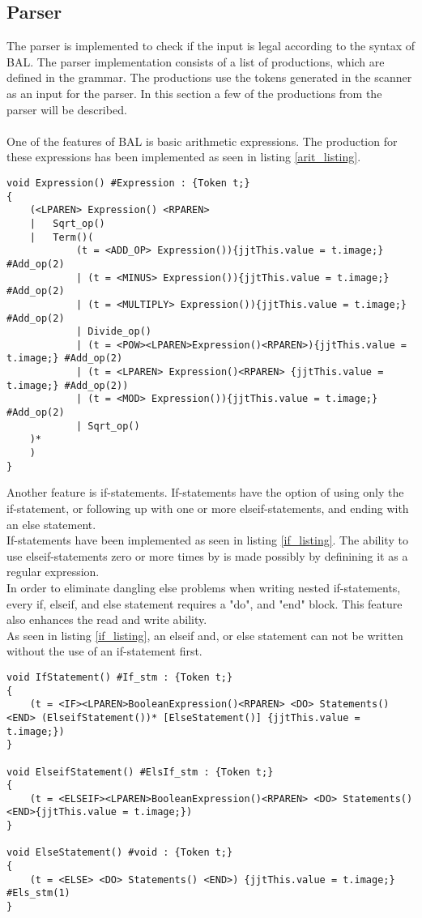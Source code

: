 \subsection{Parser}
The parser is implemented to check if the input is legal according to the syntax of BAL. The parser implementation consists of a list of productions, which are defined in the grammar. The productions use the tokens generated in the scanner as an input for the parser. In this section a few of the productions from the parser will be described.
\\
\\One of the features of BAL is basic arithmetic expressions. The production for these expressions has been implemented as seen in listing \ref{arit_listing}. 

\begin{lstlisting}[caption=Implementation of the arithmetic expressions production, label=arit_listing]
void Expression() #Expression : {Token t;}
{
	(<LPAREN> Expression() <RPAREN>
	|	Sqrt_op()
	|	Term()(
			(t = <ADD_OP> Expression()){jjtThis.value = t.image;} #Add_op(2)
			| (t = <MINUS> Expression()){jjtThis.value = t.image;} #Add_op(2)
			| (t = <MULTIPLY> Expression()){jjtThis.value = t.image;} #Add_op(2)
			| Divide_op()
			| (t = <POW><LPAREN>Expression()<RPAREN>){jjtThis.value = t.image;} #Add_op(2)
			| (t = <LPAREN> Expression()<RPAREN> {jjtThis.value = t.image;} #Add_op(2))
			| (t = <MOD> Expression()){jjtThis.value = t.image;} #Add_op(2)
			| Sqrt_op()
	)*
	)
}
\end{lstlisting}
Another feature is if-statements. If-statements have the option of using only the if-statement, or following up with one or more elseif-statements, and ending with an else statement. 
\\If-statements have been implemented as seen in listing \ref{if_listing}. The ability to use elseif-statements zero or more times by is made possibly by definining it as a regular expression.
\\In order to eliminate dangling else problems when writing nested if-statements, every if, elseif, and else statement requires a "do", and "end" block. This feature also enhances the read and write ability. 
\\As seen in listing \ref{if_listing}, an elseif and, or else statement can not be written without the use of an if-statement first.  

\begin{lstlisting}[caption=Implementation of the if\, elseif\, and else statements, label=if_listing]
void IfStatement() #If_stm : {Token t;}
{
	(t = <IF><LPAREN>BooleanExpression()<RPAREN> <DO> Statements() <END> (ElseifStatement())* [ElseStatement()] {jjtThis.value = t.image;})
}

void ElseifStatement() #ElsIf_stm : {Token t;}
{
	(t = <ELSEIF><LPAREN>BooleanExpression()<RPAREN> <DO> Statements() <END>{jjtThis.value = t.image;})
}

void ElseStatement() #void : {Token t;}
{
	(t = <ELSE> <DO> Statements() <END>) {jjtThis.value = t.image;} #Els_stm(1)
}
\end{lstlisting}

